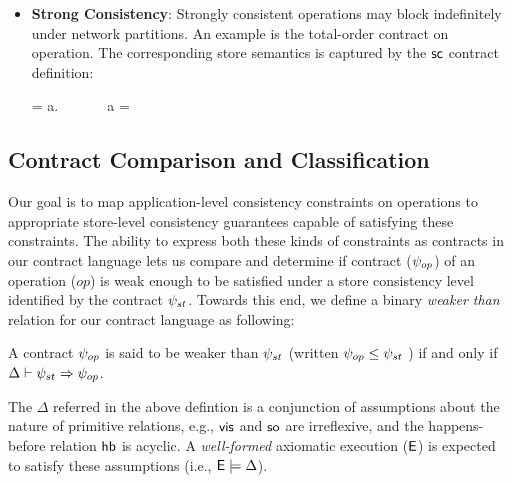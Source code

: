 \begin{itemize}
\item \textbf{Strong Consistency}: Strongly consistent operations may block
  indefinitely under network partitions. An example is the total-order
  contract on  operation. The corresponding store semantics is
  captured by the ${\sf sc}$ contract definition:

  \vspace{-1em}
  \begin{smathpar}
  \scc = \forall a.~ \Rightarrow {} ~\vee~  ~\vee~ a = \cureff
  \end{smathpar}

\end{itemize}





\subsection{Contract Comparison and Classification}

Our goal is to map application-level consistency constraints on operations
to appropriate store-level consistency guarantees capable of satisfying
these constraints.  The ability to express both these kinds of constraints
as contracts in our contract language lets us compare and determine if
contract ($\psi_{op}$) of an operation ($\mathit{op}$) is weak enough to be
satisfied under a store consistency level identified by the contract
$\psi_{st}$. Towards this end, we define a binary \emph{weaker than} relation
for our contract language as following:
\begin{definition}
A contract $\psi_{op}$ is said to be weaker than $\psi_{st}$ (written $\psi_{op}
\le \psi_{st}$ ) if and only if $\Delta \vdash \psi_{st} \Rightarrow \psi_{op}$.
\begin{center}
\end{center}
\end{definition}
\vspace{-2em}
\noindent The $\Delta$ referred in the above defintion is a
conjunction of assumptions about the nature of primitive relations,
e.g., ${\normalfont \textsf{vis}}$ and ${\normalfont \textsf{so}}$ are irreflexive, and the happens-before
relation ${\normalfont \textsf{hb}}$ is acyclic. A \emph{well-formed} axiomatic execution
(${\normalfont \textsf{E}}$) is expected to satisfy these assumptions (i.e., ${\normalfont \textsf{E}} \models
\Delta$).


